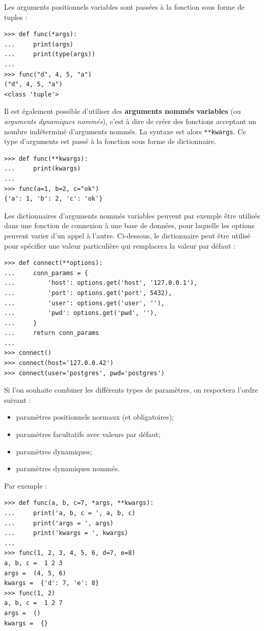 \documentclass[12pt, a4paper]{article}
\begin{document}
Les arguments positionnels variables sont passées à la fonction sous forme de tuples :
\begin{lstlisting}
>>> def func(*args):
...     print(args)
...     print(type(args))
...
>>> func("d", 4, 5, "a")
("d", 4, 5, "a")
<class 'tuple'>
\end{lstlisting}

Il est également possible d'utiliser des \textbf{arguments nommés variables} (ou \textit{arguments dynamiques nommés}), c'est à dire de créer des fonctions acceptant un nombre indéterminé d'arguments nommés. La syntaxe est alors \lstinline{**kwargs}. Ce type d'arguments est passé à la fonction sous forme de dictionnaire.
\begin{lstlisting}
>>> def func(**kwargs):
...     print(kwargs)
...
>>> func(a=1, b=2, c="ok")
{'a': 1, 'b': 2, 'c': 'ok'}
\end{lstlisting}

Les dictionnaires d'arguments nommés variables peuvent par exemple être utilisés dans une fonction de connexion à une base de données, pour laquelle les options peuvent varier d'un appel à l'autre. Ci-dessous, le dictionnaire peut être utilisé pour spécifier une valeur particulière qui remplacera la valeur par défaut :
\begin{lstlisting}
>>> def connect(**options):
...     conn_params = {
...         'host': options.get('host', '127.0.0.1'),
...         'port': options.get('port', 5432),
...         'user': options.get('user', ''),
...         'pwd': options.get('pwd', ''),
...     }
...     return conn_params
...
>>> connect()
>>> connect(host='127.0.0.42')
>>> connect(user='postgres', pwd='postgres')
\end{lstlisting}

Si l'on souhaite combiner les différents types de paramètres, on respectera l'ordre suivant : 
\begin{itemize}
	\item paramètres positionnels normaux (et obligatoires);
	\item paramètres facultatifs avec valeurs par défaut;
	\item paramètres dynamiques;
	\item paramètres dynamiques nommés.
\end{itemize}

Par exemple :
\begin{lstlisting}
>>> def func(a, b, c=7, *args, **kwargs):
...     print('a, b, c = ', a, b, c)
...     print('args = ', args)
...     print('kwargs = ', kwargs)
...
>>> func(1, 2, 3, 4, 5, 6, d=7, e=8)
a, b, c =  1 2 3
args =  (4, 5, 6)
kwargs =  {'d': 7, 'e': 8}
>>> func(1, 2)
a, b, c =  1 2 7
args =  ()
kwargs =  {}
\end{lstlisting}
\end{document}
